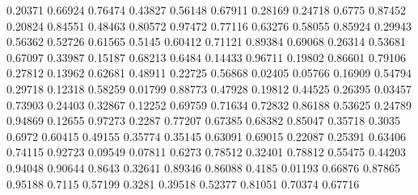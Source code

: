 \documentclass{article}
\newenvironment{eulernotebook}{\par}{\par}
\newenvironment{eulercomment}{\par\medskip}{\par\medskip}
\begin{document}
\begin{eulernotebook}
\begin{eulercomment}
\begin{eulercomment}
\begin{eulercomment}
\begin{eulercomment}
\begin{eulercomment}
\begin{eulercomment}
\begin{euleroutput}
              0.20371
              0.66924
              0.76474
              0.43827
              0.56148
              0.67911
              0.28169
              0.24718
               0.6775
              0.87452
              0.20824
              0.84551
              0.48463
              0.80572
              0.97472
              0.77116
              0.63276
              0.58055
              0.85924
              0.29943
              0.56362
              0.52726
              0.61565
               0.5145
              0.60412
              0.71121
              0.89384
              0.69068
              0.26314
              0.53681
              0.67097
              0.33987
              0.15187
              0.68213
               0.6484
              0.14433
              0.96711
              0.19802
              0.86601
              0.79106
              0.27812
              0.13962
              0.62681
              0.48911
              0.22725
              0.56868
              0.02405
              0.05766
              0.16909
              0.54794
              0.29718
              0.12318
              0.58259
              0.01799
              0.88773
              0.47928
              0.19812
              0.44525
              0.26395
              0.03457
              0.73903
              0.24403
              0.32867
              0.12252
              0.69759
              0.71634
              0.72832
              0.86188
              0.53625
              0.24789
              0.94869
              0.12655
              0.97273
               0.2287
              0.77207
              0.67385
              0.68382
              0.85047
              0.35718
               0.3035
               0.6972
              0.60415
              0.49155
              0.35774
              0.35145
              0.63091
              0.69015
              0.22087
              0.25391
              0.63406
              0.74115
              0.92723
              0.09549
              0.07811
               0.6273
              0.78512
              0.32401
              0.78812
              0.55475
              0.44203
              0.94048
              0.90644
               0.8643
              0.32641
              0.89346
              0.86088
               0.4185
              0.01193
              0.66876
              0.87865
              0.95188
               0.7115
              0.57199
               0.3281
              0.39518
              0.52377
              0.81051
              0.70374
              0.67716

\end{euleroutput}
\end{eulercomment}
\end{eulercomment}
\end{eulercomment}
\end{eulercomment}
\end{eulercomment}
\end{eulercomment}
\end{eulernotebook}
\end{document}
